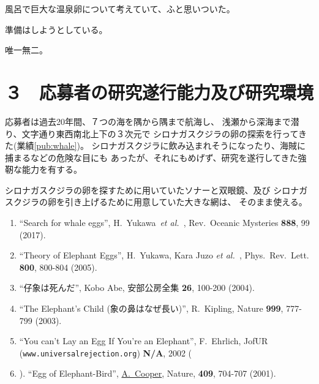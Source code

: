\documentclass[11pt,a4j,dvipdfmx]{jarticle} 					%
\newcommand{\研究課題名}{象の卵}
\newcommand{\研究機関名}{逢坂大学}
\newcommand{\研究代表者氏名}{湯川秀樹}
\newcommand{\研究期間の最終元号年度}{7}  %
\newcommand{\paper}[6]{%
	\item ``#1'', #2, #3 {\bf #4}, #5 (#6).			%
}
\newcommand{\etal}{\textit{et al.\ }}
\newcommand{\yukawa}{H.~Yukawa}					%
\newcommand{\prl}{Phys.\ Rev.\ Lett.\ }		%
\begin{document}
		風呂で巨大な温泉卵について考えていて、ふと思いついた。

	準備はしようとしている。

	唯一無二。




\section{３　応募者の研究遂行能力及び研究環境}

\PapersInstructions	%

	応募者は過去20年間、７つの海を隅から隅まで航海し、
	浅瀬から深海まで潜り、文字通り東西南北上下の３次元で
	シロナガスクジラの卵の探索を行ってきた(業績\ref{pub:whale})。
	シロナガスクジラに飲み込まれそうになったり、海賊に捕まるなどの危険な目にも
	あったが、それにもめげず、研究を遂行してきた強靭な能力を有する。

	シロナガスクジラの卵を探すために用いていたソナーと双眼鏡、及び
	シロナガスクジラの卵を引き上げるために用意していた大きな網は、
	そのまま使える。
	\begin{enumerate}
		\paper{Search for whale eggs}{\yukawa\ \etal}{Rev.\ Oceanic Mysteries}{888}{99}{2017}
			\label{pub:whale}
				
		\paper{Theory of Elephant Eggs}{\yukawa, Kara Juzo \etal}{\prl}{800}{800-804}{2005}
			\label{pub:theoegg}
				
		\paper{仔象は死んだ}{Kobo Abe}{安部公房全集}{26}{100-200}{2004}
		
		\paper{The Elephant's Child (象の鼻はなぜ長い)}{R.~Kipling}{Nature}{999}{777-799}{2003}

		\paper{You can't Lay an Egg If You're an Elephant}{F.~Ehrlich}
			{JofUR\\({\tt www.universalrejection.org})}{{\bf N/A}}{2002}
		
		\item ``Egg of Elephant-Bird'', 
				\underline{A.~Cooper},
				Nature, {\bf 409}, 704-707 (2001).	%
	\end{enumerate}
\end{document}

